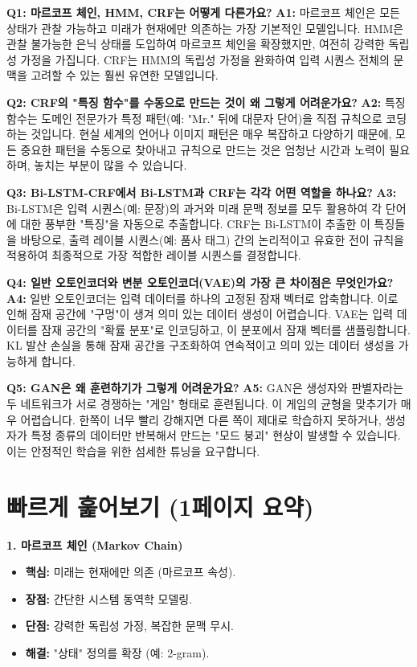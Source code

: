 \documentclass[11pt,a4paper]{article}
\theoremstyle{definition}
\begin{document}
\begin{tcolorbox}[conceptbox, title=Q\&A: 초심자를 위한 핵심 질문]
\textbf{Q1: 마르코프 체인, HMM, CRF는 어떻게 다른가요?}
\textbf{A1:} 마르코프 체인은 모든 상태가 관찰 가능하고 미래가 현재에만 의존하는 가장 기본적인 모델입니다. HMM은 관찰 불가능한 은닉 상태를 도입하여 마르코프 체인을 확장했지만, 여전히 강력한 독립성 가정을 가집니다. CRF는 HMM의 독립성 가정을 완화하여 입력 시퀀스 전체의 문맥을 고려할 수 있는 훨씬 유연한 모델입니다.

\textbf{Q2: CRF의 "특징 함수"를 수동으로 만드는 것이 왜 그렇게 어려운가요?}
\textbf{A2:} 특징 함수는 도메인 전문가가 특정 패턴(예: "Mr." 뒤에 대문자 단어)을 직접 규칙으로 코딩하는 것입니다. 현실 세계의 언어나 이미지 패턴은 매우 복잡하고 다양하기 때문에, 모든 중요한 패턴을 수동으로 찾아내고 규칙으로 만드는 것은 엄청난 시간과 노력이 필요하며, 놓치는 부분이 많을 수 있습니다.

\textbf{Q3: Bi-LSTM-CRF에서 Bi-LSTM과 CRF는 각각 어떤 역할을 하나요?}
\textbf{A3:} Bi-LSTM은 입력 시퀀스(예: 문장)의 과거와 미래 문맥 정보를 모두 활용하여 각 단어에 대한 풍부한 "특징"을 자동으로 추출합니다. CRF는 Bi-LSTM이 추출한 이 특징들을 바탕으로, 출력 레이블 시퀀스(예: 품사 태그) 간의 논리적이고 유효한 전이 규칙을 적용하여 최종적으로 가장 적합한 레이블 시퀀스를 결정합니다.

\textbf{Q4: 일반 오토인코더와 변분 오토인코더(VAE)의 가장 큰 차이점은 무엇인가요?}
\textbf{A4:} 일반 오토인코더는 입력 데이터를 하나의 고정된 잠재 벡터로 압축합니다. 이로 인해 잠재 공간에 "구멍"이 생겨 의미 있는 데이터 생성이 어렵습니다. VAE는 입력 데이터를 잠재 공간의 "확률 분포"로 인코딩하고, 이 분포에서 잠재 벡터를 샘플링합니다. KL 발산 손실을 통해 잠재 공간을 구조화하여 연속적이고 의미 있는 데이터 생성을 가능하게 합니다.

\textbf{Q5: GAN은 왜 훈련하기가 그렇게 어려운가요?}
\textbf{A5:} GAN은 생성자와 판별자라는 두 네트워크가 서로 경쟁하는 "게임" 형태로 훈련됩니다. 이 게임의 균형을 맞추기가 매우 어렵습니다. 한쪽이 너무 빨리 강해지면 다른 쪽이 제대로 학습하지 못하거나, 생성자가 특정 종류의 데이터만 반복해서 만드는 "모드 붕괴" 현상이 발생할 수 있습니다. 이는 안정적인 학습을 위한 섬세한 튜닝을 요구합니다.
\end{tcolorbox}

\newpage
\section{빠르게 훑어보기 (1페이지 요약)}

\begin{tcolorbox}[summarybox, title=핵심 개념 요약]
\textbf{1. 마르코프 체인 (Markov Chain)}
\begin{itemize}
    \item \textbf{핵심:} 미래는 현재에만 의존 (마르코프 속성).
    \item \textbf{장점:} 간단한 시스템 동역학 모델링.
    \item \textbf{단점:} 강력한 독립성 가정, 복잡한 문맥 무시.
    \item \textbf{해결:} "상태" 정의를 확장 (예: 2-gram).
\end{itemize}
\end{tcolorbox}
\end{document}
